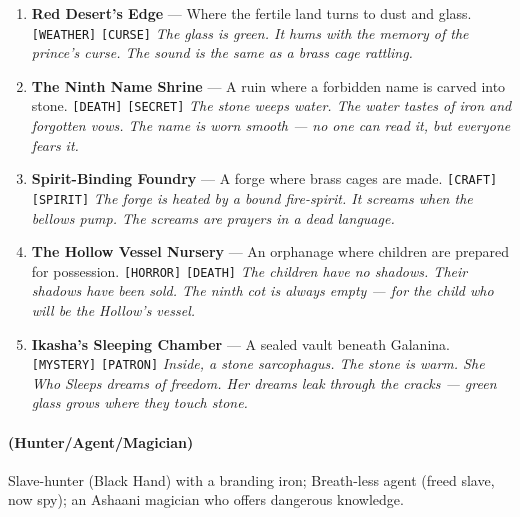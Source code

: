 \begin{enumerate}
\item \textbf{Red Desert's Edge} --- Where the fertile land turns to dust and glass. \texttt{[WEATHER]} \texttt{[CURSE]}
  \hfill \textit{The glass is green. It hums with the memory of the prince's curse. The sound is the same as a brass cage rattling.}
\item[J] \textbf{The Ninth Name Shrine} --- A ruin where a forbidden name is carved into stone. \texttt{[DEATH]} \texttt{[SECRET]}
  \hfill \textit{The stone weeps water. The water tastes of iron and forgotten vows. The name is worn smooth --- no one can read it, but everyone fears it.}
\item[Q] \textbf{Spirit-Binding Foundry} --- A forge where brass cages are made. \texttt{[CRAFT]} \texttt{[SPIRIT]}
  \hfill \textit{The forge is heated by a bound fire-spirit. It screams when the bellows pump. The screams are prayers in a dead language.}
\item[K] \textbf{The Hollow Vessel Nursery} --- An orphanage where children are prepared for possession. \texttt{[HORROR]} \texttt{[DEATH]}
  \hfill \textit{The children have no shadows. Their shadows have been sold. The ninth cot is always empty --- for the child who will be the Hollow's vessel.}
\item[A] \textbf{Ikasha's Sleeping Chamber} --- A sealed vault beneath Galanina. \texttt{[MYSTERY]} \texttt{[PATRON]}
  \hfill \textit{Inside, a stone sarcophagus. The stone is warm. She Who Sleeps dreams of freedom. Her dreams leak through the cracks --- green glass grows where they touch stone.}
\end{enumerate}

\paragraph*{(Hunter/Agent/Magician)} Slave-hunter (Black Hand) with a branding iron; Breath-less agent (freed slave, now spy); an Ashaani magician who offers dangerous knowledge.

